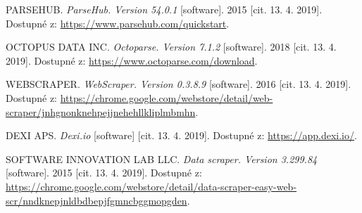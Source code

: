 \documentclass[thesis=B,czech]{FITthesis2}[2012/06/26]
\begin{document}
	\begin{thebibliography}{9}
		PARSEHUB. \textit{ParseHub. Version 54.0.1} [software]. 2015 [cit. 13. 4. 2019]. Dostupné z: \url{https://www.parsehub.com/quickstart}.
		
		OCTOPUS DATA INC. \textit{Octoparse. Version 7.1.2} [software]. 2018 [cit. 13. 4. 2019]. Dostupné z: \url{https://www.octoparse.com/download}.
		
		WEBSCRAPER. \textit{WebScraper. Version 0.3.8.9} [software]. 2016 [cit. 13. 4. 2019]. Dostupné z: \url{https://chrome.google.com/webstore/detail/web-scraper/jnhgnonknehpejjnehehllkliplmbmhn}.
		
		DEXI APS. \textit{Dexi.io} [software] [cit. 13. 4. 2019]. Dostupné z: \url{https://app.dexi.io/}.
		
		SOFTWARE INNOVATION LAB LLC. \textit{Data scraper. Version 3.299.84} [software]. 2015 [cit. 13. 4. 2019]. Dostupné z: \url{https://chrome.google.com/webstore/detail/data-scraper-easy-web-scr/nndknepjnldbdbepjfgmncbggmopgden}.
		
	\end{thebibliography}

	\appendix
	
\end{document}
